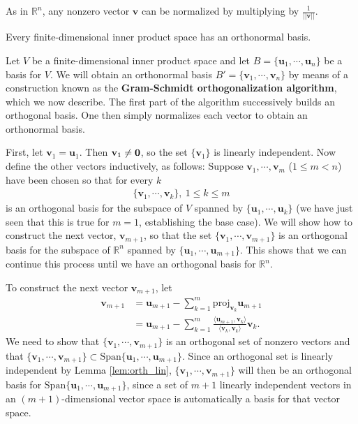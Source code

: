 \documentclass[12pt,letterpaper,reqno]{article}
\numberwithin{equation}{section}
\newcommand{\bv}{\mathbf{v}}
\newcommand{\bu}{\mathbf{u}}
\begin{document}
As in $\mathbb{R}^n$, any nonzero vector $\bv$ can be normalized by multiplying by $\frac{1}{||\bv||}$. 

\begin{thm}
	Every finite-dimensional inner product space has an orthonormal basis.
\end{thm}

\begin{pf}
	Let $V$ be a finite-dimensional inner product space and let $B=\{\bu_1,\cdots, \bu_n\}$ be a basis for $V$. We will obtain an orthonormal basis $B'=\{\bv_1,\cdots,\bv_n\}$ by means of a construction known as the {\bf Gram-Schmidt orthogonalization algorithm}, which we now describe. The first part of the algorithm successively builds an orthogonal basis. One then simply normalizes each vector to obtain an orthonormal basis.
	
	 First, let $\bv_1=\bu_1$. Then $\bv_1 \neq {\bf 0}$, so the set $\{\bv_1\}$ is linearly independent. Now define the other vectors inductively, as follows: Suppose $\bv_1,\cdots,\bv_m$ ($1 \leq m < n$) have been chosen so that for every $k$
	\begin{align*}
		\{\bv_1,\cdots,\bv_k\}, \ 1 \leq k \leq m
	\end{align*}
	is an orthogonal basis for the subspace of $V$ spanned by $\{\bu_1,\cdots,\bu_k\}$ (we have just seen that this is true for $m=1$, establishing the base case). We will show how to construct the next vector, $\bv_{m+1}$, so that the set $\{\bv_1,\cdots,\bv_{m+1}\}$ is an orthogonal basis for the subspace of $\mathbb{R}^n$ spanned by $\{\bu_1,\cdots,\bu_{m+1}\}$. This shows that we can continue this process until we have an orthogonal basis for $\mathbb{R}^n$. 
	
	To construct the next vector $\bv_{m+1}$, let 
	\begin{equation}\label{eq:next_vector}
	\begin{split}
		\bv_{m+1}&=\bu_{m+1}-\sum_{k=1}^{m}\text{proj}_{\bv_k}\bu_{m+1} \\
		&=\bu_{m+1}-\sum_{k=1}^{m}\frac{\langle \bu_{m+1},\bv_k\rangle}{\langle \bv_k,\bv_k \rangle}\bv_k.
			\end{split}
	\end{equation}
We need to show that $\{\bv_1,\cdots,\bv_{m+1}\}$ is an orthogonal set of nonzero vectors and that $\{\bv_1,\cdots,\bv_{m+1}\}\subset \text{Span}\{\bu_1,\cdots,\bu_{m+1}\}$. Since an orthogonal set is linearly independent by Lemma \ref{lem:orth_lin}, $\{\bv_1,\cdots,\bv_{m+1}\}$ will then be an orthogonal basis for $\text{Span}\{\bu_1,\cdots,\bu_{m+1}\}$, since a set of $m+1$ linearly independent vectors in an $(m+1)$-dimensional vector space is automatically a basis for that vector space. 
	

\end{pf}
\end{document}
